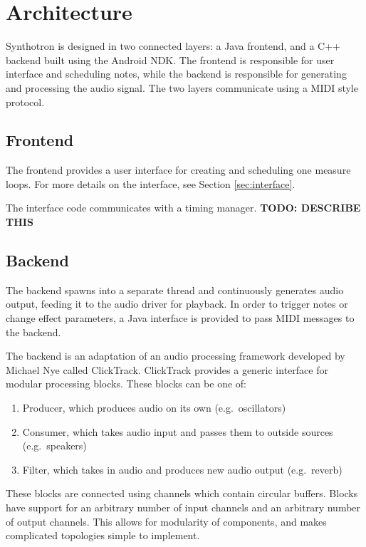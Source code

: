 \documentclass[letterpaper,12pt]{article}
\begin{document}
\section{Architecture}

Synthotron is designed in two connected layers: a Java frontend, and a C++ backend built using the Android NDK. The frontend is responsible for user interface and scheduling notes, while the backend is responsible for generating and processing the audio signal. The two layers communicate using a MIDI style protocol.

\subsection{Frontend}

The frontend provides a user interface for creating and scheduling one measure loops. For more details on the interface, see Section \ref{sec:interface}.

The interface code communicates with a timing manager. \textbf{TODO: DESCRIBE THIS}


\subsection{Backend}

The backend spawns into a separate thread and continuously generates audio output, feeding it to the audio driver for playback. In order to trigger notes or change effect parameters, a Java interface is provided to pass MIDI messages to the backend.

The backend is an adaptation of an audio processing framework developed by Michael Nye called ClickTrack\cite{clicktrack}. ClickTrack provides a generic interface for modular processing blocks. These blocks can be one of:
\begin{enumerate}
    \item Producer, which produces audio on its own (e.g.\ oscillators)
    \item Consumer, which takes audio input and passes them to outside sources (e.g.\ speakers)
    \item Filter, which takes in audio and produces new audio output (e.g.\ reverb)
\end{enumerate}
These blocks are connected using channels which contain circular buffers. Blocks have support for an arbitrary number of input channels and an arbitrary number of output channels. This allows for modularity of components, and makes complicated topologies simple to implement.
\end{document}
